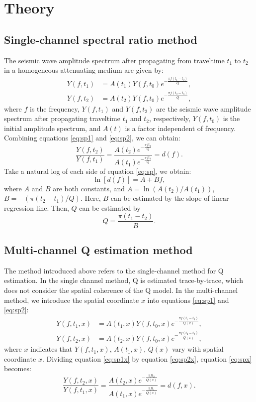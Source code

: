 \section{Theory}

\subsection{Single-channel spectral ratio method}
The  seismic wave amplitude spectrum after propagating from traveltime $t_1$ to $t_2$ in a homogeneous attenuating medium are given by:
\begin{align}
\label{eq:sp1}
Y(f,t_1) &= A(t_1)Y(f,t_0)e^{-\frac{\pi f(t_1-t_0)}{Q}},\\
\label{eq:sp2}
Y(f,t_2) &= A(t_2)Y(f,t_0)e^{-\frac{\pi f(t_2-t_0)}{Q}},
\end{align}
where $f$ is the frequency, $Y(f,t_1)$ and $Y(f,t_2)$ are the seismic wave amplitude spectrum after propagating traveltime $t_1$ and $t_2$, respectively, $Y(f,t_0)$ is the initial amplitude spectrum, and $A(t)$ is a factor independent of frequency. Combining equations \ref{eq:sp1} and \ref{eq:sp2}, we can obtain:
\begin{equation}
\label{eq:sp}
\frac{Y(f,t_2)}{Y(f,t_1)} = \frac{A(t_2)e^{-\frac{\pi ft_2}{Q}}}{A(t_1)e^{-\frac{\pi ft_1}{Q}}} = d(f).
\end{equation}
Take a natural log of each side of equation \ref{eq:sp}, we obtain:
\begin{equation}
\label{eq:log}
\ln[d(f)] = A+Bf,
\end{equation} 
where $A$ and $B$ are both constants, and $A=\ln(A(t_2)/A(t_1))$, $B=-(\pi(t_2-t_1)/Q)$. Here, $B$ can be estimated by the slope of linear regression line. Then, $Q$ can be estimated by 
\begin{equation}
\label{eq:q}
Q=\frac{\pi(t_1-t_2)}{B}.
\end{equation}

\subsection{Multi-channel Q estimation method}
The method introduced above refers to the single-channel method for Q estimation. In the single channel method, Q is estimated trace-by-trace, which does not consider the spatial coherence of the Q model. In the multi-channel method, we introduce the spatial coordinate $x$ into equations \ref{eq:sp1} and \ref{eq:sp2}:
\begin{align}
\label{eq:sp1x}
Y(f,t_1,x) &= A(t_1,x)Y(f,t_0,x)e^{-\frac{\pi f(t_1-t_0)}{Q(x)}},\\
\label{eq:sp2x}
Y(f,t_2,x) &= A(t_2,x)Y(f,t_0,x)e^{-\frac{\pi f(t_2-t_0)}{Q(x)}},
\end{align}
where $x$ indicates that $Y(f,t_1,x)$, $A(t_1,x)$, $Q(x)$ vary with spatial coordinate $x$. Dividing equation \ref{eq:sp1x} by equation \ref{eq:sp2x}, equation \ref{eq:spx} becomes:
\begin{equation}
\label{eq:spx}
\frac{Y(f,t_2,x)}{Y(f,t_1,x)} = \frac{A(t_2,x)e^{-\frac{\pi ft_2}{Q(x)}}}{A(t_1,x)e^{-\frac{\pi ft_1}{Q(x)}}} = d(f,x).
\end{equation}

